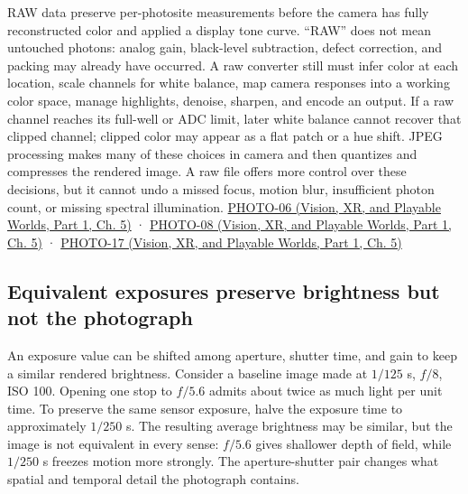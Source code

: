RAW data preserve per-photosite measurements before the camera has fully reconstructed color and applied a display tone curve. ``RAW'' does not mean untouched photons: analog gain, black-level subtraction, defect correction, and packing may already have occurred. A raw converter still must infer color at each location, scale channels for white balance, map camera responses into a working color space, manage highlights, denoise, sharpen, and encode an output. If a raw channel reaches its full-well or ADC limit, later white balance cannot recover that clipped channel; clipped color may appear as a flat patch or a hue shift. JPEG processing makes many of these choices in camera and then quantizes and compresses the rendered image. A raw file offers more control over these decisions, but it cannot undo a missed focus, motion blur, insufficient photon count, or missing spectral illumination. \href{../07-Vision-XR-and-Playable-Worlds-P01/main.pdf\#nameddest=04-visual-computing-ii-ch036-photo-06---photography-session-06}{PHOTO-06 (Vision, XR, and Playable Worlds, Part 1, Ch. 5)} · \href{../07-Vision-XR-and-Playable-Worlds-P01/main.pdf\#nameddest=04-visual-computing-ii-ch036-photo-08---photography-session-08}{PHOTO-08 (Vision, XR, and Playable Worlds, Part 1, Ch. 5)} · \href{../07-Vision-XR-and-Playable-Worlds-P01/main.pdf\#nameddest=04-visual-computing-ii-ch036-photo-17---photography-session-17}{PHOTO-17 (Vision, XR, and Playable Worlds, Part 1, Ch. 5)}

\subsection{Equivalent exposures preserve brightness but not the photograph}\label{03-visual-computing-i-ch003-equivalent-exposures-preserve-brightness-but-not-the-photograph}

\hypertarget{03-visual-computing-i-ch003-equivalent-exposures-preserve-brightness-but-not-the-photograph}{}

An exposure value can be shifted among aperture, shutter time, and gain to keep a similar rendered brightness. Consider a baseline image made at \(1/125\) s, \(f/8\), ISO 100. Opening one stop to \(f/5.6\) admits about twice as much light per unit time. To preserve the same sensor exposure, halve the exposure time to approximately \(1/250\) s. The resulting average brightness may be similar, but the image is not equivalent in every sense: \(f/5.6\) gives shallower depth of field, while \(1/250\) s freezes motion more strongly. The aperture-shutter pair changes what spatial and temporal detail the photograph contains.


